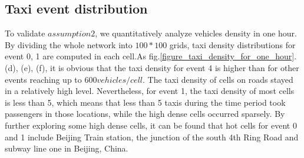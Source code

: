 \subsection{Taxi event distribution}
\label{section_taxi_denstiy_distribution}

To validate $assumption 2$, we quantitatively analyze vehicles density in one hour. By dividing the whole network into $100*100$ grids, taxi density distributions for event 0, 1 are computed in each cell.As fig.\ref{figure_taxi_density_for_one_hour}.(d), (e), (f), it is obvious that the taxi density for event 4 is higher than for other events reaching up to $600 vehicles/cell$. The taxi density of cells on roads stayed in a relatively high level. Nevertheless, for event 1, the taxi density of most cells is less than 5, which means that less than 5 taxis during the time period took passengers in those locations, while the high dense cells occurred sparsely. By further exploring some high dense cells, it can be found that hot cells for event 0 and 1 include Beijing Train station, the junction of the south 4th Ring Road and subway line one in Beijing, China.


